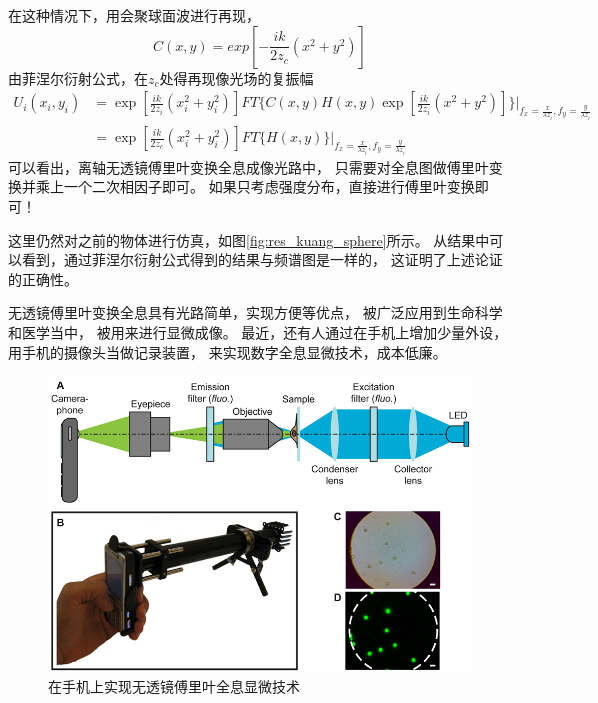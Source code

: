 \documentclass[11pt,a4paper]{article}
\begin{document}
在这种情况下，用会聚球面波进行再现，
\[
C(x,y) = exp[-\frac{i k }{2 z_c}(x^2+y^2)]
\]
由菲涅尔衍射公式，在$z_c$处得再现像光场的复振幅
\begin{equation}
\begin{split}
U_i(x_i,y_i) &= \exp[\frac{i k}{2 z_i}(x_i^2+y_i^2)] FT\{C(x,y)H(x,y)\exp[\frac{i k}{2 z_i}(x^2+y^2)]\}|_{f_x=\frac{x}{\lambda z_i}, f_y=\frac{y}{\lambda z_i}} \\
			&= \exp[\frac{i k}{2 z_c}(x_i^2+y_i^2)] FT\{ H(x,y)\}|_{f_x=\frac{x}{\lambda z_i}, f_y=\frac{y}{\lambda z_i}}
\end{split}
\end{equation}
可以看出，离轴无透镜傅里叶变换全息成像光路中，
只需要对全息图做傅里叶变换并乘上一个二次相因子即可。
如果只考虑强度分布，直接进行傅里叶变换即可！

这里仍然对之前的物体进行仿真，如图\ref{fig:res_kuang_sphere}所示。
从结果中可以看到，通过菲涅尔衍射公式得到的结果与频谱图是一样的，
这证明了上述论证的正确性。


无透镜傅里叶变换全息具有光路简单，实现方便等优点，
被广泛应用到生命科学和医学当中\cite{dirksen2001lensless,pushkarsky2014automated}，
被用来进行显微成像。
最近，还有人通过在手机上增加少量外设，用手机的摄像头当做记录装置，
来实现数字全息显微技术，成本低廉\cite{vashist2014cellphone,breslauer2009mobile,tseng2010lensfree}。

\begin{figure}[htb]
  \centering
  \includegraphics[width=\textwidth]{DHmobile1.png}
  \caption{在手机上实现无透镜傅里叶全息显微技术\cite{tseng2010lensfree}}
  \label{fig:DHcellphone1}
\end{figure}
\end{document}
